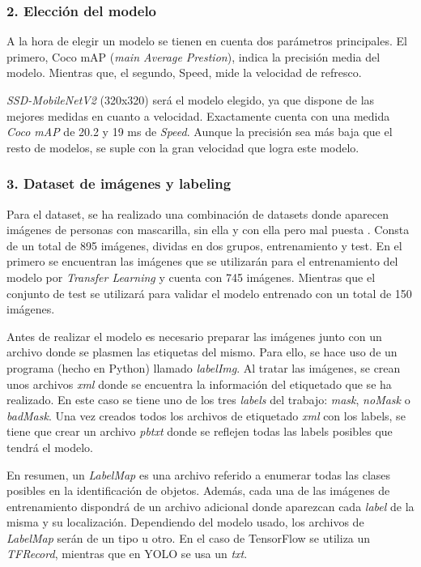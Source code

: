 \vspace{-0.5cm}
\subsubsection*{2. Elección del modelo}
\vspace{-0.7cm}
A la hora de elegir un modelo se tienen en cuenta dos parámetros principales. El primero, Coco mAP (\textit{main Average Prestion}), indica la precisión media del modelo. Mientras que, el segundo, Speed, mide la velocidad de refresco.

\textit{SSD-MobileNetV2} (320x320) será el modelo elegido, ya que dispone de las mejores medidas en cuanto a velocidad. Exactamente cuenta con una medida \textit{Coco mAP} de 20.2 y 19 ms de \textit{Speed}. Aunque la precisión sea más baja que el resto de modelos, se suple con la gran velocidad que logra este modelo.

\vspace{-0.5cm}
\subsubsection*{3. Dataset de imágenes y labeling}
\vspace{-0.7cm}
Para el dataset, se ha realizado una combinación de datasets donde aparecen imágenes de personas con mascarilla, sin ella y con ella pero mal puesta \cite{Cabani_2021} \cite{datasetMask}. Consta de un total de 895 imágenes, dividas en dos grupos, entrenamiento y test. En el primero se encuentran las imágenes que se utilizarán para el entrenamiento del modelo por \textit{Transfer Learning} y cuenta con 745 imágenes. Mientras que el conjunto de test se utilizará para validar el modelo entrenado con un total de 150 imágenes.

Antes de realizar el modelo es necesario preparar las imágenes junto con un archivo donde se plasmen las etiquetas del mismo. Para ello, se hace uso de un programa (hecho en Python) llamado \textit{labelImg}. Al tratar las imágenes, se crean unos archivos \textit{xml} donde se encuentra la información del etiquetado que se ha realizado. En este caso se tiene uno de los tres \textit{labels} del trabajo: \textit{mask}, \textit{noMask} o \textit{badMask}. Una vez creados todos los archivos de etiquetado \textit{xml} con los labels, se tiene que crear un archivo \textit{pbtxt} donde se reflejen todas las labels posibles que tendrá el modelo.

En resumen, un \textit{LabelMap} es una archivo referido a enumerar todas las clases posibles en la identificación de objetos. Además, cada una de las imágenes de entrenamiento dispondrá de un archivo adicional donde aparezcan cada \textit{label} de la misma y su localización. Dependiendo del modelo usado, los archivos de \textit{LabelMap} serán de un tipo u otro. En el caso de TensorFlow se utiliza un \textit{TFRecord}, mientras que en YOLO se usa un \textit{txt}.

